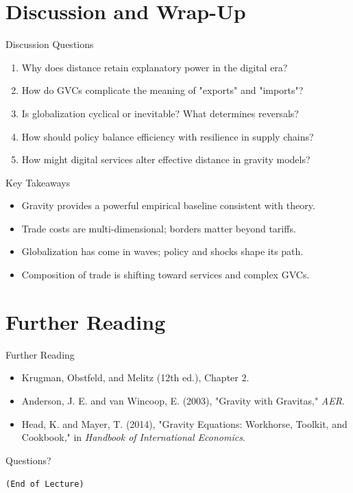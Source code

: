 \documentclass{beamer}
\begin{document}
\section{Discussion and Wrap-Up}
\begin{frame}{Discussion Questions}
\begin{enumerate}
  \item Why does distance retain explanatory power in the digital era?
  \item How do GVCs complicate the meaning of "exports" and "imports"?
  \item Is globalization cyclical or inevitable? What determines reversals?
  \item How should policy balance efficiency with resilience in supply chains?
  \item How might digital services alter effective distance in gravity models?
\end{enumerate}
\end{frame}

\begin{frame}{Key Takeaways}
\begin{itemize}
  \item Gravity provides a powerful empirical baseline consistent with theory.
  \item Trade costs are multi-dimensional; borders matter beyond tariffs.
  \item Globalization has come in waves; policy and shocks shape its path.
  \item Composition of trade is shifting toward services and complex GVCs.
\end{itemize}
\end{frame}

\section*{Further Reading}
\begin{frame}{Further Reading}
\begin{itemize}
  \item Krugman, Obstfeld, and Melitz (12th ed.), Chapter 2.
  \item Anderson, J. E. and van Wincoop, E. (2003), "Gravity with Gravitas," \emph{AER}.
  \item Head, K. and Mayer, T. (2014), "Gravity Equations: Workhorse, Toolkit, and Cookbook," in \emph{Handbook of International Economics}.
\end{itemize}
\end{frame}

\begin{frame}[plain]
\centering \Large Questions?\par
\vspace{1em}
\normalsize \texttt{(End of Lecture)}
\end{frame}
\end{document}
